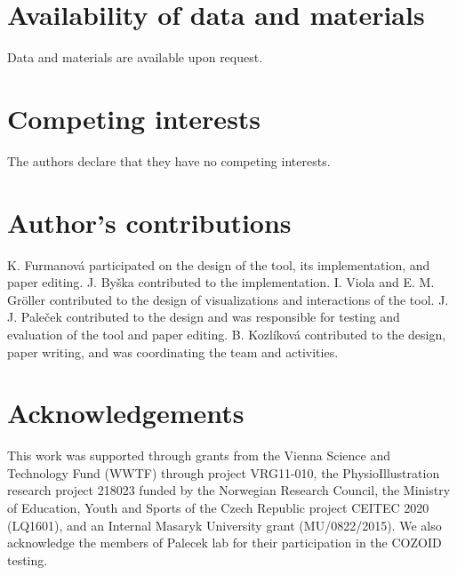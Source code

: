 \documentclass{bmcart}
\begin{document}

\begin{backmatter}
\section*{Availability of data and materials}
Data and materials are available upon request.

\section*{Competing interests}
  The authors declare that they have no competing interests.

\section*{Author's contributions}
K. Furmanov\'{a} participated on the design of the tool, its implementation, and paper editing.  J. By\v{s}ka contributed to the implementation. I. Viola and E. M. Gr\"{o}ller contributed to the design of visualizations and interactions of the tool. J. J. Pale\v{c}ek contributed to the design and was responsible for testing and evaluation of the tool and paper editing. B. Kozl\'{i}kov\'{a} contributed to the design, paper writing, and was coordinating the team and activities.

\section*{Acknowledgements}
This work was supported through grants from the Vienna Science and Technology Fund (WWTF) through project VRG11-010, the PhysioIllustration research project 218023 funded by the Norwegian Research Council, the Ministry of Education, Youth and Sports of the Czech Republic project CEITEC 2020 (LQ1601), and an Internal Masaryk University grant (MU/0822/2015). We also acknowledge the members of Palecek lab for their participation in the COZOID testing. 



\end{backmatter}
\end{document}
